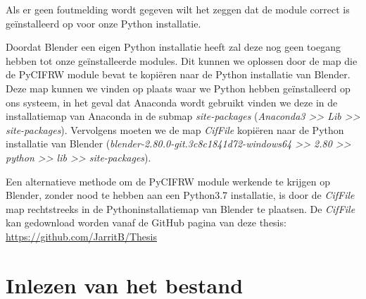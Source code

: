 Als er geen foutmelding wordt gegeven wilt het zeggen dat de module correct is geïnstalleerd op voor onze Python installatie. 
\par
Doordat Blender een eigen Python installatie heeft zal deze nog geen toegang hebben tot onze geïnstalleerde modules. Dit kunnen we oplossen door de map die de PyCIFRW module bevat te kopiëren naar de Python installatie van Blender. Deze map kunnen we vinden op plaats waar we Python hebben geïnstalleerd op ons systeem, in het geval dat Anaconda wordt gebruikt vinden we deze in de installatiemap van Anaconda in de submap \textit{site-packages} (\textit{Anaconda3 \textgreater \textgreater{} Lib \textgreater \textgreater{} site-packages}).
Vervolgens moeten we de map \textit{CifFile} kopiëren naar de Python installatie van Blender (\textit{blender-2.80.0-git.3c8c1841d72-windows64 \textgreater \textgreater{} 2.80 \textgreater \textgreater{} python \textgreater \textgreater{} lib \textgreater \textgreater{} site-packages}). 
\par
Een alternatieve methode om de PyCIFRW module werkende te krijgen op Blender, zonder nood te hebben aan een Python3.7 installatie, is door de \textit{CifFile} map rechtstreeks in de Pythoninstallatiemap van Blender te plaatsen. De \textit{CifFile} kan gedownload worden vanaf de GitHub pagina van deze thesis: \url{https://github.com/JarritB/Thesis}
  
\section{Inlezen van het bestand}

